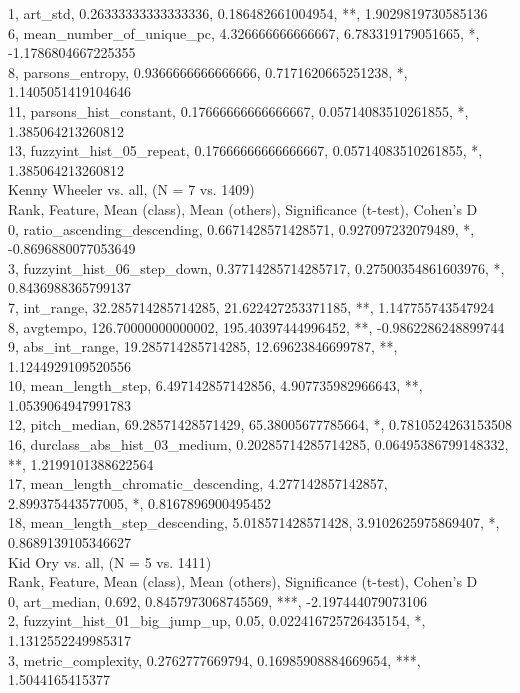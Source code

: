 1, art_std, 0.26333333333333336, 0.186482661004954, **, 1.9029819730585136\\
6, mean_number_of_unique_pc, 4.326666666666667, 6.783319179051665, *, -1.1786804667225355\\
8, parsons_entropy, 0.9366666666666666, 0.7171620665251238, *, 1.1405051419104646\\
11, parsons_hist_constant, 0.17666666666666667, 0.05714083510261855, *, 1.385064213260812\\
13, fuzzyint_hist_05_repeat, 0.17666666666666667, 0.05714083510261855, *, 1.385064213260812\\
Kenny Wheeler vs. all, (N = 7 vs. 1409)\\
Rank, Feature, Mean (class), Mean (others), Significance (t-test), Cohen's D\\
0, ratio_ascending_descending, 0.6671428571428571, 0.927097232079489, *, -0.8696880077053649\\
3, fuzzyint_hist_06_step_down, 0.37714285714285717, 0.27500354861603976, *, 0.8436988365799137\\
7, int_range, 32.285714285714285, 21.622427253371185, **, 1.147755743547924\\
8, avgtempo, 126.70000000000002, 195.40397444996452, **, -0.9862286248899744\\
9, abs_int_range, 19.285714285714285, 12.69623846699787, **, 1.1244929109520556\\
10, mean_length_step, 6.497142857142856, 4.907735982966643, **, 1.0539064947991783\\
12, pitch_median, 69.28571428571429, 65.38005677785664, *, 0.7810524263153508\\
16, durclass_abs_hist_03_medium, 0.20285714285714285, 0.06495386799148332, **, 1.2199101388622564\\
17, mean_length_chromatic_descending, 4.277142857142857, 2.899375443577005, *, 0.8167896900495452\\
18, mean_length_step_descending, 5.018571428571428, 3.9102625975869407, *, 0.8689139105346627\\
Kid Ory vs. all, (N = 5 vs. 1411)\\
Rank, Feature, Mean (class), Mean (others), Significance (t-test), Cohen's D\\
0, art_median, 0.692, 0.8457973068745569, ***, -2.197444079073106\\
2, fuzzyint_hist_01_big_jump_up, 0.05, 0.022416725726435154, *, 1.1312552249985317\\
3, metric_complexity, 0.2762777669794, 0.16985908884669654, ***, 1.5044165415377\\
